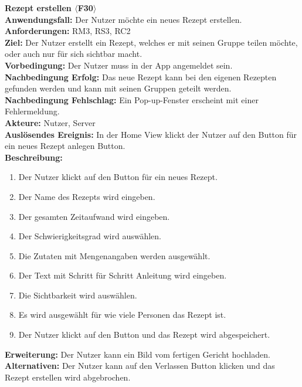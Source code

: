 \documentclass[parskip=full]{scrartcl}
\begin{document}
\textbf{Rezept erstellen $\langle$F30$\rangle$}\\
\textbf{Anwendungsfall:} Der Nutzer möchte ein neues Rezept erstellen.\\
\textbf{Anforderungen:} RM3, RS3, RC2\\
\textbf{Ziel:} Der Nutzer erstellt ein Rezept, welches er mit seinen Gruppe teilen möchte, oder auch nur für sich sichtbar macht.\\
\textbf{Vorbedingung:} Der Nutzer muss in der App angemeldet sein.\\
\textbf{Nachbedingung Erfolg:} Das neue Rezept kann bei den eigenen Rezepten gefunden werden und kann mit seinen Gruppen geteilt werden.\\
\textbf{Nachbedingung Fehlschlag:} Ein Pop-up-Fenster erscheint mit einer Fehlermeldung.\\
\textbf{Akteure:} Nutzer, Server\\
\textbf{Auslösendes Ereignis:} In der Home View klickt der Nutzer auf den Button für ein neues Rezept anlegen Button.\\
\textbf{Beschreibung:}
\begin{enumerate}
    \item Der Nutzer klickt auf den Button für ein neues Rezept.
    \item Der Name des Rezepts wird eingeben.
    \item Der gesamten Zeitaufwand wird eingeben.
    \item Der Schwierigkeitsgrad wird auswählen.
    \item Die Zutaten mit Mengenangaben werden ausgewählt.
    \item Der Text mit Schritt für Schritt Anleitung wird eingeben.
    \item Die Sichtbarkeit wird auswählen.
    \item Es wird ausgewählt für wie viele Personen das Rezept ist.
    \item Der Nutzer klickt auf den Button und das Rezept wird abgespeichert.
\end{enumerate}
\textbf{Erweiterung:} Der Nutzer kann ein Bild vom fertigen Gericht hochladen.\\
\textbf{Alternativen:} Der Nutzer kann auf den Verlassen Button klicken und das Rezept erstellen wird abgebrochen.\\
\newpage
\end{document}
